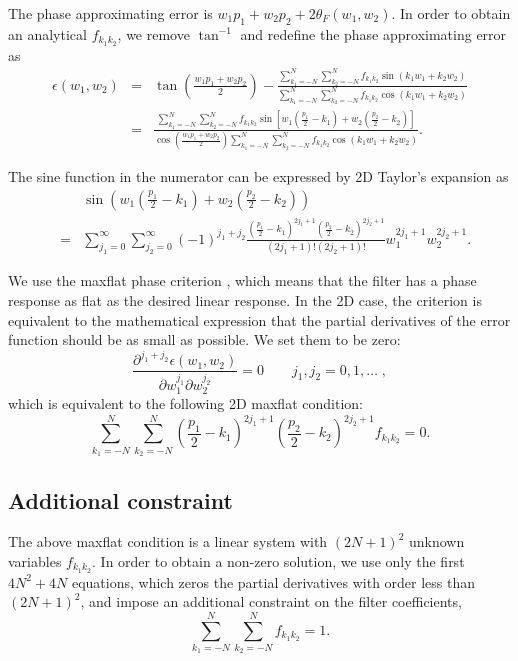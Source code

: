 The phase approximating error is $w_1p_1+w_2p_2+2\theta_F(w_1,w_2)$.
In order to obtain an analytical $f_{k_1k_2}$,
we remove $\tan^{-1}$ and redefine the phase approximating error as
\begin{eqnarray}
\epsilon(w_1,w_2) &=&
\tan(\frac{w_1p_1+w_2p_2}{2})
-\frac{
\displaystyle{\sum_{k_1=-N}^N\sum_{k_2=-N}^N
f_{k_1k_2}\sin(k_1w_1+k_2w_2)}
}{
\displaystyle{\sum_{k_1=-N}^N\sum_{k_2=-N}^N
f_{k_1k_2}\cos(k_1w_1+k_2w_2)}
}
\nonumber \\ &=&
\frac{
\displaystyle{\sum_{k_1=-N}^N\sum_{k_2=-N}^N
f_{k_1k_2}\sin[w_1(\frac{p_1}{2}-k_1)+w_2(\frac{p_2}{2}-k_2)]}
}{
\cos(\frac{w_1p_1+w_2p_2}{2})
\displaystyle{\sum_{k_1=-N}^N\sum_{k_2=-N}^N
f_{k_1k_2}\cos(k_1w_1+k_2w_2)}
}.
\end{eqnarray}

The sine function in the numerator can be expressed by
2D Taylor's expansion as 
\begin{eqnarray*}
&&\sin(w_1(\frac{p_1}{2}-k_1)+w_2(\frac{p_2}{2}-k_2))
\\ &=&
\sum_{j_1=0}^\infty\sum_{j_2=0}^\infty
(-1)^{j_1+j_2}\frac{
(\frac{p_1}{2}-k_1)^{2j_1+1}(\frac{p_2}{2}-k_2)^{2j_2+1}
}{(2j_1+1)!(2j_2+1)!}
w_1^{2j_1+1}w_2^{2j_2+1}.
\end{eqnarray*}

We use the maxflat phase criterion 
\cite[]{thiran1971recursive},
which means that the filter has a phase response 
as flat as the desired linear response.
In the 2D case, the criterion 
is equivalent to the mathematical expression that
the partial derivatives of the error function should be as small as possible.
We set them to be zero:
\begin{equation}
\frac{\partial^{j_1+j_2}\epsilon(w_1,w_2)}
{\partial w_1^{j_1}\partial w_2^{j_2}}=0
\qquad j_1,j_2=0,1,\dots\;,
\end{equation}
which is equivalent to the following 2D maxflat condition:
\begin{equation}\label{eq:mf2d}
\sum_{k_1=-N}^N\sum_{k_2=-N}^N
(\frac{p_1}{2}-k_1)^{2j_1+1}(\frac{p_2}{2}-k_2)^{2j_2+1}f_{k_1k_2}=0.
\end{equation}

\subsection{Additional constraint}

The above maxflat condition is a linear system
with $(2N+1)^2$ unknown variables $f_{k_1k_2}$.
In order to obtain a non-zero solution, 
we use only the first $4N^2+4N$ equations,
which zeros the partial derivatives 
with order less than $(2N+1)^2$,
and impose an additional constraint on the filter coefficients,
\begin{equation}\label{eq:pcmf}
\sum_{k_1=-N}^N\sum_{k_2=-N}^Nf_{k_1k_2}=1.
\end{equation}

